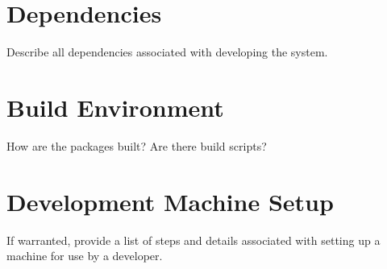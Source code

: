 \section{Dependencies}
Describe all dependencies associated with developing the system. 

\section{Build  Environment}
How are the packages built?  Are there build scripts? 

\section{Development Machine Setup}
If warranted, provide a list of steps and details associated with setting up a 
machine for use by a developer. 


